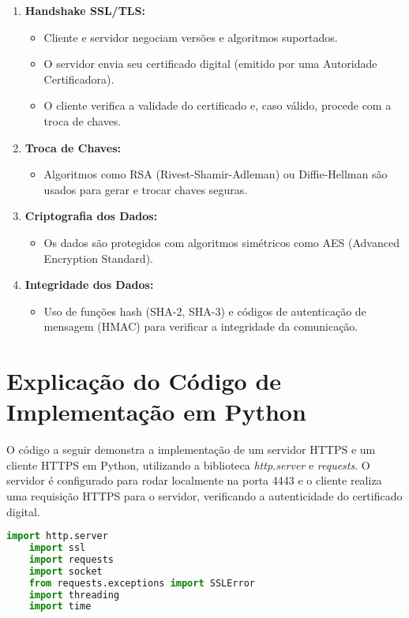 \documentclass[a4paper,12pt]{article}
\begin{document}
\begin{enumerate}
\item \textbf{Handshake SSL/TLS:}
\begin{itemize}
\item Cliente e servidor negociam versões e algoritmos suportados.
\item O servidor envia seu certificado digital (emitido por uma Autoridade Certificadora).
\item O cliente verifica a validade do certificado e, caso válido, procede com a troca de chaves.
\end{itemize}
\item \textbf{Troca de Chaves:}
\begin{itemize}
\item Algoritmos como RSA (Rivest-Shamir-Adleman) ou Diffie-Hellman são usados para gerar e trocar chaves seguras.
\end{itemize}
\item \textbf{Criptografia dos Dados:}
\begin{itemize}
\item Os dados são protegidos com algoritmos simétricos como AES (Advanced Encryption Standard).
\end{itemize}
\item \textbf{Integridade dos Dados:}
\begin{itemize}
\item Uso de funções hash (SHA-2, SHA-3) e códigos de autenticação de mensagem (HMAC) para verificar a integridade da comunicação.
\end{itemize}
\end{enumerate}

\section{Explicação do Código de Implementação em Python}

O código a seguir demonstra a implementação de um servidor HTTPS e um cliente HTTPS em Python, utilizando a biblioteca \textit{http.server} e \textit{requests}. O servidor é configurado para rodar localmente na porta 4443 e o cliente realiza uma requisição HTTPS para o servidor, verificando a autenticidade do certificado digital.
\begin{lstlisting}[language=Python]
    import http.server
    import ssl
    import requests
    import socket
    from requests.exceptions import SSLError
    import threading
    import time
\end{lstlisting}
\end{document}
